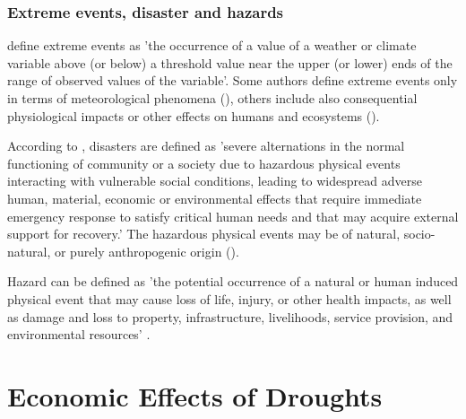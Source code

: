 \documentclass[a4paper,12pt]{article}
\begin{document}
\subsubsection*{Extreme events, disaster and hazards}
\cite{IPCC2012ch1} define extreme events as 'the occurrence of a value of a weather or climate variable above (or below) a threshold value near the upper (or lower) ends of the range of observed values of the variable'. Some authors define extreme events only in terms of meteorological phenomena (\citealp{easterling2000, Jentsch2007}), others include also consequential physiological impacts or other effects on humans and ecosystems (\citealp{IPCC2012ch1, young2002}).


According to \cite{IPCC2012ch1}, disasters are defined as 'severe alternations in the normal functioning of community or a society due to hazardous physical events interacting with vulnerable social conditions, leading to widespread adverse human, material, economic or environmental effects that require immediate emergency response to satisfy critical human needs and that may acquire external support for recovery.' The hazardous physical events may be of natural, socio-natural, or purely anthropogenic origin (\citealp{IPCC2012ch1, wisner2004risk}).

Hazard can be defined as 'the potential occurrence of a natural or human induced
physical event that may cause loss of life, injury, or other
health impacts, as well as damage and loss to property, infrastructure,
livelihoods, service provision, and environmental resources' \citet{IPCC2012ch1}.

 \section*{Economic Effects of Droughts}
 
\end{document}
